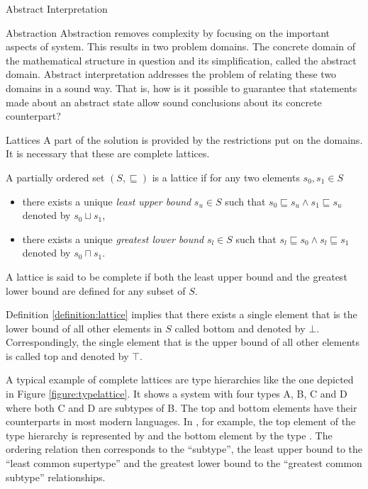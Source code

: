 \begin{chapter}{Abstract Interpretation}
\begin{section}{Abstraction}
		Abstraction removes complexity by focusing on the important aspects of system. This results in two problem domains. The concrete domain of the mathematical structure in question and its simplification, called the abstract domain. Abstract interpretation addresses the problem of relating these two domains in a sound way. That is, how is it possible to guarantee that statements made about an abstract state allow sound conclusions about its concrete counterpart?


		\begin{subsection}{Lattices}
			A part of the solution is provided by the restrictions put on the domains. It is necessary that these are complete lattices.
			
			\begin{definition}[Lattice] 
				\label{definition:lattice}
				A partially ordered set $(S, \sqsubseteq)$ is a lattice if for any two elements $s_0, s_1 \in S$
				\begin{itemize}
					\item there exists a unique \emph{least upper bound} $s_u \in S$ such that $s_0 \sqsubseteq s_u \land s_1 \sqsubseteq s_u$ denoted by $s_0 \sqcup s_1$,
					\item there exists a unique \emph{greatest lower bound} $s_l \in S$ such that $s_l \sqsubseteq s_0 \land s_l \sqsubseteq s_1$ denoted by $s_0 \sqcap s_1$.
				\end{itemize}
				A lattice is said to be complete if both the least upper bound and the greatest lower bound are defined for any subset of $S$. 
			\end{definition}
				
			Definition \ref{definition:lattice} implies that there exists a single element that is the lower bound of all other elements in $S$ called bottom and denoted by $\bot$. Correspondingly, the single element that is the upper bound of all other elements is called top and denoted by $\top$.

			\begin{example}
				A typical example of complete lattices are type hierarchies like the one depicted in Figure \ref{figure:typelattice}. It shows a system with four types A, B, C and D where both C and D are subtypes of B. The top and bottom elements have their counterparts in most modern languages. In \scala, for example, the top element of the type hierarchy is represented by  and the bottom element by the type . The ordering relation then corresponds to the ``subtype'', the least upper bound to the ``least common supertype'' and the greatest lower bound to the ``greatest common subtype'' relationships.
				\exampleend


\end{example}
\end{subsection}
\end{section}
\end{chapter}
